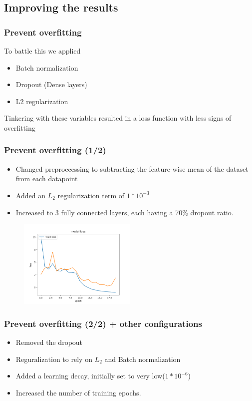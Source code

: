 \documentclass{beamer}
\begin{document}
\subsection{Improving the results}
\begin{frame}
  \frametitle{Prevent overfitting}
  To battle this we applied
  \begin{itemize}
    \item Batch normalization
    \item Dropout (Dense layers)
    \item L2 regularization
  \end{itemize}
  Tinkering with these variables resulted in a loss function with less signs of overfitting
\end{frame}

\begin{frame}
  \frametitle{Prevent overfitting (1/2)}
  \begin{itemize}
    \item  Changed preproccessing to subtracting the feature-wise mean of the dataset from each datapoint
    \item Added an $L_{2}$ regularization term of $1*10^{-3}$
    \item Increased to 3 fully connected layers, each having a 70\% dropout ratio.
  \end{itemize}
  \begin{figure}[!h]
  \centering
  \includegraphics[width=0.5\textwidth]{images/improved_loss_1.png}
  \end{figure}
\end{frame}


\begin{frame}
  \frametitle{Prevent overfitting (2/2) + other configurations}
  \begin{itemize}
    \item Removed the dropout
    \item Reguralization to rely on $L_{2}$ and Batch normalization
    \item Added a learning decay, initially set to very low($1*10^{-6}$)
    \item Increased the number of training epochs.
  \end{itemize}
\end{frame}
\end{document}
